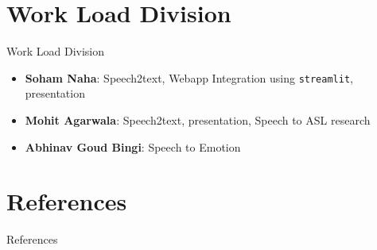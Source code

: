 \documentclass[10pt]{beamer}
\begin{document}
\section{Work Load Division}
\begin{frame}{Work Load Division}
\begin{itemize}
	\item \textbf{Soham Naha}: Speech2text, Webapp Integration using \texttt{streamlit}, presentation
	\item \textbf{Mohit Agarwala}: Speech2text, presentation, Speech to ASL research
	\item \textbf{Abhinav Goud Bingi}: Speech to Emotion
\end{itemize}
\end{frame}
 
\section{References}
\begin{frame}{References}
	\tiny    
    \printbibliography
\end{frame}
\end{document}
